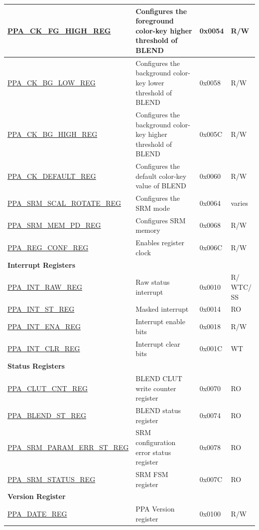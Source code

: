 \begin{longtable}{ | p{6cm} | p{7.2cm} | p{1.3cm} | p{1cm} | }
\hyperref[regdesc:PPACKFGHIGHREG]{PPA\_CK\_FG\_HIGH\_REG} & Configures the foreground color-key higher threshold of BLEND & 0x0054 & R/W \\ \hline
\hyperref[regdesc:PPACKBGLOWREG]{PPA\_CK\_BG\_LOW\_REG} & Configures the background color-key lower threshold of BLEND & 0x0058 & R/W \\ \hline
\hyperref[regdesc:PPACKBGHIGHREG]{PPA\_CK\_BG\_HIGH\_REG} & Configures the background color-key higher threshold of BLEND & 0x005C & R/W \\ \hline
\hyperref[regdesc:PPACKDEFAULTREG]{PPA\_CK\_DEFAULT\_REG} & Configures the default color-key value of BLEND & 0x0060 & R/W \\ \hline
\hyperref[regdesc:PPASRMSCALROTATEREG]{PPA\_SRM\_SCAL\_ROTATE\_REG} & Configures the SRM mode & 0x0064 & varies \\ \hline
\hyperref[regdesc:PPASRMMEMPDREG]{PPA\_SRM\_MEM\_PD\_REG} & Configures SRM memory & 0x0068 & R/W \\ \hline
\hyperref[regdesc:PPAREGCONFREG]{PPA\_REG\_CONF\_REG} & Enables register clock & 0x006C & R/W \\ \hline
\multicolumn{4}{|l|}{\textbf{Interrupt Registers}} \\ \hline
\hyperref[regdesc:PPAINTRAWREG]{PPA\_INT\_RAW\_REG} & Raw status interrupt & 0x0010 & \makecell[l]{R/\\WTC/\\SS} \\ \hline
\hyperref[regdesc:PPAINTSTREG]{PPA\_INT\_ST\_REG} & Masked interrupt & 0x0014 & RO \\ \hline
\hyperref[regdesc:PPAINTENAREG]{PPA\_INT\_ENA\_REG} & Interrupt enable bits & 0x0018 & R/W \\ \hline
\hyperref[regdesc:PPAINTCLRREG]{PPA\_INT\_CLR\_REG} & Interrupt clear bits & 0x001C & WT \\ \hline
\multicolumn{4}{|l|}{\textbf{Status Registers}} \\ \hline
\hyperref[regdesc:PPACLUTCNTREG]{PPA\_CLUT\_CNT\_REG} & BLEND CLUT write counter register & 0x0070 & RO \\ \hline
\hyperref[regdesc:PPABLENDSTREG]{PPA\_BLEND\_ST\_REG} & BLEND status register & 0x0074 & RO \\ \hline
\hyperref[regdesc:PPASRMPARAMERRSTREG]{PPA\_SRM\_PARAM\_ERR\_ST\_REG} & SRM configuration error status register & 0x0078 & RO \\ \hline
\hyperref[regdesc:PPASRMSTATUSREG]{PPA\_SRM\_STATUS\_REG} & SRM FSM register & 0x007C & RO \\ \hline
\multicolumn{4}{|l|}{\textbf{Version Register}} \\ \hline
\hyperref[regdesc:PPADATEREG]{PPA\_DATE\_REG} & PPA Version register & 0x0100 & R/W \\ \hline
\end{longtable}
